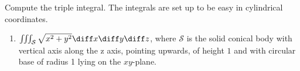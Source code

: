 Compute the triple integral. The integrals are set up to be easy in cylindrical coordinates.

\begin{enumerate}
\item $\iiint_{\mathcal S} \sqrt{x^2+y^2}\diff x\diff y \diff z$, where $\mathcal S$ is the solid conical body with vertical axis along the z axis, pointing upwards, of height $1$ and with circular base of radius 1 lying on the $xy$-plane.
\end{enumerate}